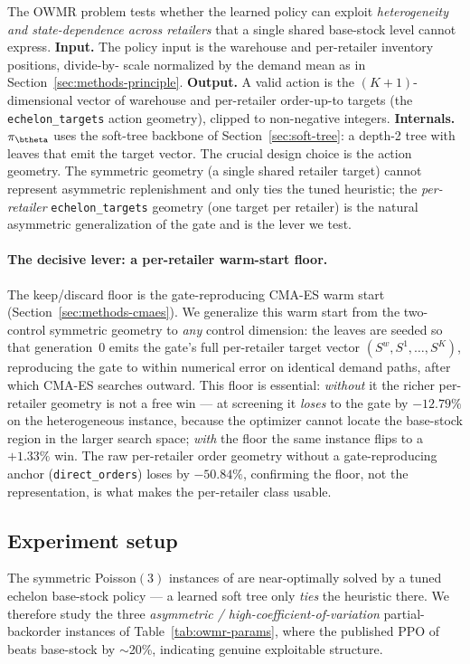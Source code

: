 The OWMR problem tests whether the learned policy can exploit \emph{heterogeneity and
state-dependence across retailers} that a single shared base-stock level cannot express.
\textbf{Input.} The policy input is the warehouse and per-retailer inventory positions, divide-by-
scale normalized by the demand mean as in Section~\ref{sec:methods-principle}. \textbf{Output.} A
valid action is the $(K{+}1)$-dimensional vector of warehouse and per-retailer order-up-to targets
(the \texttt{echelon\_targets} action geometry), clipped to non-negative integers. \textbf{Internals.}
$\pi_{\btheta}$ uses the soft-tree backbone of Section~\ref{sec:soft-tree}: a depth-2 tree with leaves
that emit the target vector. The crucial design choice is the action geometry. The symmetric
geometry (a single shared retailer target) cannot represent asymmetric replenishment and only ties
the tuned heuristic; the \emph{per-retailer} \texttt{echelon\_targets} geometry (one target per
retailer) is the natural asymmetric generalization of the gate and is the lever we test.

\paragraph{The decisive lever: a per-retailer warm-start floor.}
The keep/discard floor is the gate-reproducing CMA-ES warm start (Section~\ref{sec:methods-cmaes}). We
generalize this warm start from the two-control symmetric geometry to \emph{any} control dimension:
the leaves are seeded so that generation~0 emits the gate's full per-retailer target vector
$(S^w,S^1,\dots,S^K)$, reproducing the gate to within numerical error on identical demand paths, after
which CMA-ES searches outward. This floor is essential: \emph{without} it the richer per-retailer
geometry is not a free win --- at screening it \emph{loses} to the gate by $-12.79\%$ on the
heterogeneous instance, because the optimizer cannot locate the base-stock region in the larger
search space; \emph{with} the floor the same instance flips to a $+1.33\%$ win. The raw per-retailer
order geometry without a gate-reproducing anchor (\texttt{direct\_orders}) loses by $-50.84\%$,
confirming the floor, not the representation, is what makes the per-retailer class usable.

\subsection{Experiment setup}
\label{sec:owmr-setup}

The symmetric Poisson$(3)$ instances of \citet{kaynov2024owmr} are near-optimally solved by a tuned
echelon base-stock policy --- a learned soft tree only \emph{ties} the heuristic there. We therefore
study the three \emph{asymmetric / high-coefficient-of-variation} partial-backorder instances of
Table~\ref{tab:owmr-params}, where the published PPO of \citet{kaynov2024owmr} beats base-stock by
$\sim$20\%, indicating genuine exploitable structure.

